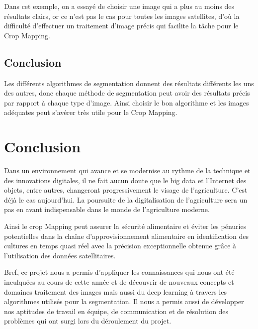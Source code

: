 \documentclass[12pt, openany]{report}
\begin{document}
Dans cet exemple, on a essayé de choisir une image qui a plus au moins des résultats clairs, or ce n’est pas le cas pour toutes les images satellites, d’où la difficulté d’effectuer un traitement d’image précis qui facilite la tâche pour le Crop Mapping.

\section*{Conclusion}
Les différents algorithmes de segmentation donnent des résultats différents les uns des autres, donc chaque méthode de segmentation peut avoir des résultats précis par rapport à chaque type d'image.
Ainsi choisir le bon algorithme et les images adéquates peut s'avérer très utile pour le Crop Mapping.


\chapter*{Conclusion}

Dans un environnement qui avance et se modernise au rythme de la technique et des innovations digitales, il ne fait aucun doute que le big data et l'Internet des objets, entre autres, changeront progressivement le visage de l'agriculture. C’est déjà le cas aujourd’hui. La poursuite de la digitalisation de l'agriculture sera un pas en avant indispensable dans le monde de l'agriculture moderne.
\par
Ainsi le crop Mapping peut assurer la sécurité alimentaire et éviter les pénuries potentielles dans la chaîne d'approvisionnement alimentaire en identification des cultures en temps quasi réel avec la précision exceptionnelle obtenue grâce à l'utilisation des données satellitaires.
\par
Bref, ce projet nous a permis d’appliquer les connaissances qui nous ont été inculquées au cours de cette année et de découvrir de nouveaux concepts et domaines traitement des images mais aussi du deep learning à travers les algorithmes utilisés pour la segmentation.
Il nous a permis aussi de développer nos aptitudes de travail en équipe, de communication et de résolution des problèmes qui ont surgi lors du déroulement du projet.



\end{document}
